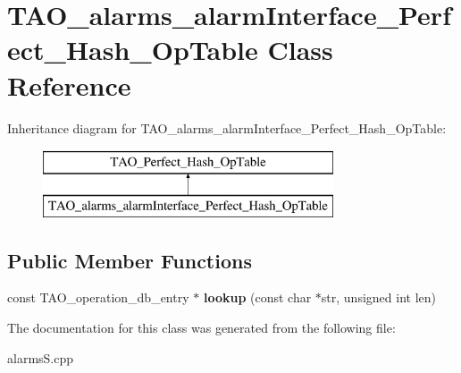 \section{T\+A\+O\+\_\+alarms\+\_\+alarm\+Interface\+\_\+\+Perfect\+\_\+\+Hash\+\_\+\+Op\+Table Class Reference}
\label{classTAO__alarms__alarmInterface__Perfect__Hash__OpTable}
Inheritance diagram for T\+A\+O\+\_\+alarms\+\_\+alarm\+Interface\+\_\+\+Perfect\+\_\+\+Hash\+\_\+\+Op\+Table\+:\begin{figure}[H]
\begin{center}
\leavevmode
\includegraphics[height=2.000000cm]{classTAO__alarms__alarmInterface__Perfect__Hash__OpTable}
\end{center}
\end{figure}
\subsection*{Public Member Functions}
\begin{DoxyCompactItemize}
\item 
const T\+A\+O\+\_\+operation\+\_\+db\+\_\+entry $\ast$ {\bfseries lookup} (const char $\ast$str, unsigned int len)\label{classTAO__alarms__alarmInterface__Perfect__Hash__OpTable_a5dffdf5ba8c5679bf079fcbd64897d43}

\end{DoxyCompactItemize}


The documentation for this class was generated from the following file\+:\begin{DoxyCompactItemize}
\item 
alarms\+S.\+cpp\end{DoxyCompactItemize}
